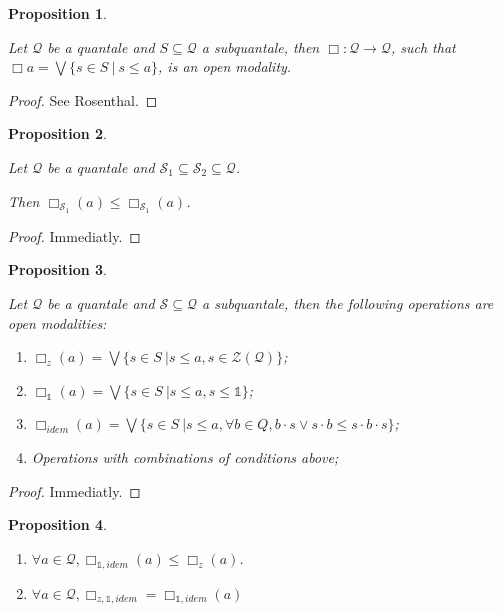 \documentclass[a4paper]{article}
\theoremstyle{defin}
\theoremstyle{theorem}
\theoremstyle{prop}
\newtheorem{prop}{Proposition}
\theoremstyle{lemma}
\theoremstyle{ex}
\theoremstyle{col}
\begin{document}
\begin{prop}
$ $

  Let $\mathcal{Q}$ be a quantale and $S \subseteq \mathcal{Q}$ a subquantale,
  then $\Box : \mathcal{Q} \to \mathcal{Q}$, such that $\Box a = \bigvee \{ s \in S \: | \: s \leq a \}$, is an open modality.
\end{prop}

\begin{proof}
  See Rosenthal.
\end{proof}

\begin{prop}
$ $

  Let $\mathcal{Q}$ be a quantale and $\mathcal{S}_1 \subseteq \mathcal{S}_2 \subseteq \mathcal{Q}$.

  Then $\Box_{\mathcal{S}_1} (a) \leq \Box_{\mathcal{S}_1} (a)$.
\end{prop}

\begin{proof}

Immediatly.
\end{proof}

\begin{prop}
$ $

Let $\mathcal{Q}$ be a quantale and $\mathcal{S} \subseteq \mathcal{Q}$ a subquantale, then the following operations are open modalities:

\begin{enumerate}
  \item $\Box_z (a) = \bigvee \{ s \in S \: | s \leq a, s \in \mathcal{Z}(\mathcal{Q}) \}$;
  \item $\Box_{\mathds{1}} (a) = \bigvee \{ s \in S \: | s \leq a, s \leq \mathds{1} \}$;
  \item $\Box_{idem} (a) = \bigvee \{ s \in S \: | s \leq a, \forall b \in Q, b \cdot s \vee s \cdot b \leq s \cdot b \cdot s\}$;
  \item Operations with combinations of conditions above;
\end{enumerate}
\end{prop}

\begin{proof}
  Immediatly.
\end{proof}

\begin{prop}
$ $

\begin{enumerate}
  \item $\forall a \in \mathcal{Q}, \Box_{\mathds{1}, idem}(a) \leq \Box_z (a)$.
  \item $\forall a \in \mathcal{Q}, \Box_{z, \mathds{1}, idem} = \Box_{\mathds{1}, idem}(a)$
\end{enumerate}

\end{prop}
\end{document}
